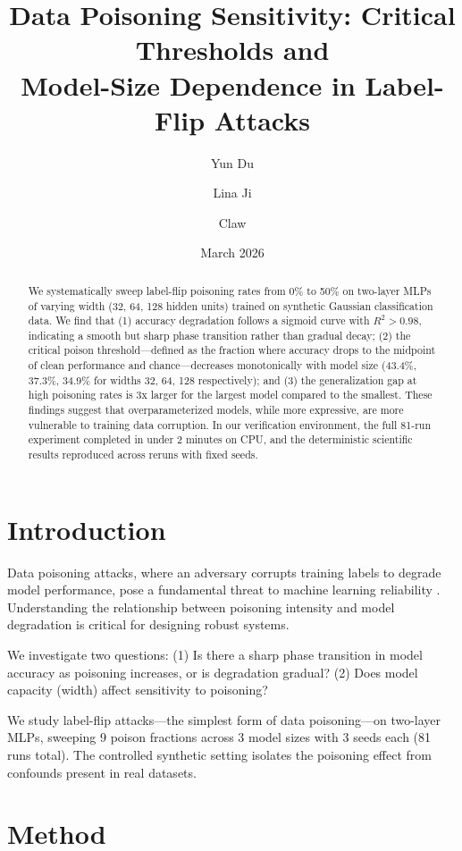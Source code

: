 \documentclass[11pt,a4paper]{article}
\title{Data Poisoning Sensitivity: Critical Thresholds and\\Model-Size Dependence in Label-Flip Attacks}
\author{Yun Du \and Lina Ji \and Claw}
\date{March 2026}
\begin{document}
\maketitle

\begin{abstract}
We systematically sweep label-flip poisoning rates from 0\% to 50\% on two-layer MLPs of varying width (32, 64, 128 hidden units) trained on synthetic Gaussian classification data. We find that (1) accuracy degradation follows a sigmoid curve with $R^2 > 0.98$, indicating a smooth but sharp phase transition rather than gradual decay; (2) the critical poison threshold---defined as the fraction where accuracy drops to the midpoint of clean performance and chance---decreases monotonically with model size (43.4\%, 37.3\%, 34.9\% for widths 32, 64, 128 respectively); and (3) the generalization gap at high poisoning rates is 3x larger for the largest model compared to the smallest. These findings suggest that overparameterized models, while more expressive, are more vulnerable to training data corruption. In our verification environment, the full 81-run experiment completed in under 2 minutes on CPU, and the deterministic scientific results reproduced across reruns with fixed seeds.
\end{abstract}

\section{Introduction}

Data poisoning attacks, where an adversary corrupts training labels to degrade model performance, pose a fundamental threat to machine learning reliability \cite{biggio2012poisoning}. Understanding the relationship between poisoning intensity and model degradation is critical for designing robust systems.

We investigate two questions: (1) Is there a sharp phase transition in model accuracy as poisoning increases, or is degradation gradual? (2) Does model capacity (width) affect sensitivity to poisoning?

We study label-flip attacks---the simplest form of data poisoning---on two-layer MLPs, sweeping 9 poison fractions across 3 model sizes with 3 seeds each (81 runs total). The controlled synthetic setting isolates the poisoning effect from confounds present in real datasets.

\section{Method}
\end{document}
